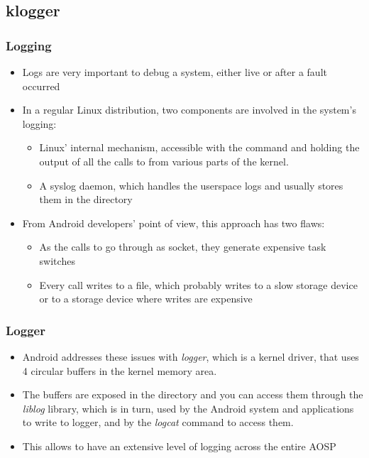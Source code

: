 \subsection{klogger}
\begin{frame}
  \frametitle{Logging}
  \begin{itemize}
  \item Logs are very important to debug a system, either live
    or after a fault occurred
  \item In a regular Linux distribution, two components are involved
    in the system's logging:
    \begin{itemize}
    \item Linux' internal mechanism, accessible with the 
      command and holding the output of all the calls to  from
      various parts of the kernel.
    \item A syslog daemon, which handles the userspace logs and
      usually stores them in the  directory
    \end{itemize}
  \item From Android developers' point of view, this approach has two flaws:
    \begin{itemize}
    \item As the calls to  go through as socket, they generate
      expensive task switches
    \item Every call writes to a file, which probably writes to a
      slow storage device or to a storage device where writes are expensive
    \end{itemize}
  \end{itemize}
\end{frame}

\begin{frame}
  \frametitle{Logger}
  \begin{itemize}
  \item Android addresses these issues with \textit{logger}, which is
    a kernel driver, that uses 4 circular buffers in the kernel memory
    area.
  \item The buffers are exposed in the  directory and you can
    access them through the \textit{liblog} library, which is in turn, used by
    the Android system and applications to write to logger, and by
    the \textit{logcat} command to access them.
  \item This allows to have an extensive level of logging across the
    entire AOSP
  \end{itemize}
\end{frame}
